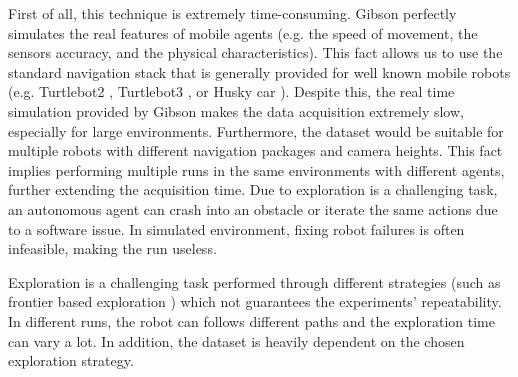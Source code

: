 First of all, this technique is extremely time-consuming. Gibson perfectly simulates the real features of mobile agents (e.g. the speed of movement, the sensors accuracy, and the physical characteristics). This fact allows us to use the standard navigation stack that is generally provided for well known mobile robots (e.g. Turtlebot2 \cite{turtlebot2}, Turtlebot3 \cite{turtlebot3}, or Husky car \cite{husky}). Despite this, the real time simulation provided by Gibson makes the data acquisition extremely slow, especially for large environments.  Furthermore, the dataset would be suitable for multiple robots with different navigation packages and camera heights. This fact implies performing multiple runs in the same environments with different agents, further extending the acquisition time. Due to exploration is a challenging task, an autonomous agent can crash into an obstacle or iterate the same actions due to a software issue. In simulated environment, fixing robot failures is often infeasible, making the run useless. 

Exploration is a challenging task performed through different strategies (such as frontier based exploration \cite{frontierexploration}) which not guarantees the experiments' repeatability. In different runs, the robot can follows different paths and the exploration time can vary a lot. In addition, the dataset is heavily dependent on the chosen exploration strategy.

